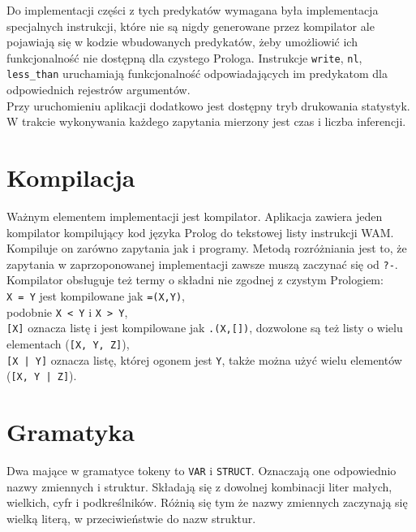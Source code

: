 Do implementacji części z tych predykatów wymagana była implementacja specjalnych instrukcji, które nie są nigdy generowane przez kompilator ale pojawiają się w kodzie wbudowanych predykatów, żeby umożliowić ich funkcjonalność nie dostępną dla czystego Prologa. Instrukcje \texttt{write}, \texttt{nl}, \texttt{less\_than} uruchamiają funkcjonalność odpowiadających im predykatom dla odpowiednich rejestrów argumentów.\\

Przy uruchomieniu aplikacji dodatkowo jest dostępny tryb drukowania statystyk. W trakcie wykonywania każdego zapytania mierzony jest czas i liczba inferencji.\\

\section{Kompilacja}

Ważnym elementem implementacji jest kompilator. Aplikacja zawiera jeden kompilator kompilujący kod języka Prolog do tekstowej listy instrukcji WAM. Kompiluje on zarówno zapytania jak i programy. Metodą rozróżniania jest to, że zapytania w zaprzoponowanej implementacji zawsze muszą zaczynać się od \texttt{?-}.\\
Kompilator obsługuje też termy o składni nie zgodnej z czystym Prologiem:\\
\texttt{X = Y} jest kompilowane jak \texttt{=(X,Y)},\\
podobnie \texttt{X < Y} i \texttt{X > Y},\\
\texttt{[X]} oznacza listę i jest kompilowane jak \texttt{.(X,[])}, dozwolone są też listy o wielu elementach (\texttt{[X, Y, Z]}),\\
\texttt{[X | Y]} oznacza listę, której ogonem jest \texttt{Y}, także można użyć wielu elementów (\texttt{[X, Y | Z]}).

\section{Gramatyka}

Dwa mające w gramatyce tokeny to \texttt{VAR} i \texttt{STRUCT}. Oznaczają one odpowiednio nazwy zmiennych i struktur. Składają się z dowolnej kombinacji liter małych, wielkich, cyfr i podkreślników. Różnią się tym że nazwy zmiennych zaczynają się wielką literą, w przeciwieństwie do nazw struktur.\\

\newcommand{\INDSTATE}[1][1]{\STATE\hspace{#1\algorithmicindent}}

